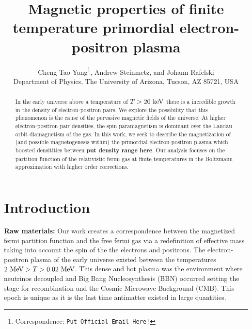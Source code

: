 \documentclass[a4paper]{article}
\title{\boldmath Magnetic properties of finite temperature primordial electron-positron plasma}
\author{Cheng Tao Yang\orc{\orcB}\thanks{Correspondence: \texttt{Put Official Email Here!}}, Andrew Steinmetz\orc{\orcC}, and Johann Rafelski\orc{\orcA}\\ Department of Physics, The University of Arizona, Tucson, AZ 85721, USA}
\begin{document}
\maketitle

\begin{abstract}
    In the early universe above a temperature of $T>20\text{ keV}$ there is a incredible growth in the density of electron-positron pairs. We explore the possibility that this phenomenon is the cause of the pervasive magnetic fields of the universe. At higher electron-positron pair densities, the spin paramagnetism is dominant over the Landau orbit diamagnetism of the gas. In this work, we seek to describe the magnetization of (and possible magnetogenesis within) the primordial electron-positron plasma which boosted densitities between \textbf{put density range here}. Our analysis focuses on the partition function of the relativistic fermi gas at finite temperatures in the Boltzmann approximation with higher order corrections.
\end{abstract}


\section{Introduction}\label{sec:Introduction}
\textbf{Raw materials:} Our work creates a correspondence between the magnetized fermi partition function and the free fermi gas via a redefinition of effective mass taking into account the spin of the the electrons and positrons. The electron-positron plasma of the early universe existed between the temperatures $2\text{ MeV}>T>0.02\text{ MeV}$.  This dense and hot plasma was the environment where neutrinos decoupled and Big Bang Nucleosynthesis (BBN) occurred setting the stage for recombination and the Cosmic Microwave Background (CMB). This epoch is unique as it is the last time antimatter existed in large quantities.
\end{document}
